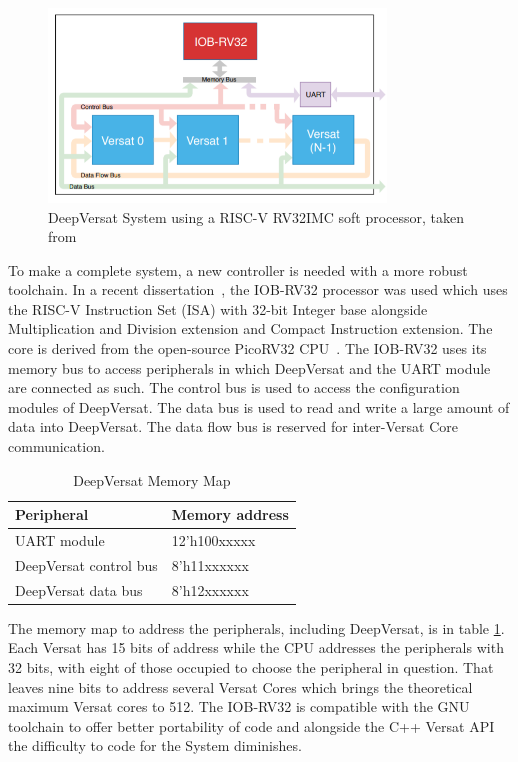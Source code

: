 \begin{figure}[!htbp]
    \centering
    \includegraphics[width=0.8\textwidth]{Figures/deep-Versat-top.png}
    \caption{DeepVersat System using a RISC-V RV32IMC soft processor, taken from~\cite{valter:deepversat}}
    \label{figure:deepversattop}
\end{figure} 

\quad To make a complete system, a new controller is needed with a more robust toolchain.
In a recent dissertation~\cite{valter:deepversat}, the IOB-RV32 processor was used which uses the RISC-V Instruction Set (ISA) with 32-bit Integer base alongside Multiplication and Division extension and Compact Instruction extension.
 The core is derived from
the open-source PicoRV32 CPU~\cite{picorv}.
The IOB-RV32 uses its memory bus to access peripherals in which DeepVersat and the UART module are connected as such.
The control bus is used to access the configuration modules of DeepVersat. The data bus is used to read and write
a large amount of data into DeepVersat. The data flow bus is reserved for inter-Versat Core communication.

\begin{table}[!htbp]
    \centering
    \begin{tabular}{|ll|}
        \hline
        \textbf{Peripheral}     & \textbf{Memory address} \\ \hline
        UART module             & 12’h100xxxxx            \\ \hline
        DeepVersat control bus & 8’h11xxxxxx             \\ \hline
        DeepVersat data bus    & 8’h12xxxxxx             \\ \hline
        \end{tabular}
    \caption{DeepVersat Memory Map}
    \label{table:deepversat}
    \end{table}


The memory map to address the peripherals,
 including DeepVersat, is in table \ref{table:deepversat}.
 Each Versat has 15 bits of address while the CPU addresses
 the peripherals with 32 bits, with eight of those occupied to choose
 the peripheral in question. That leaves nine bits to address several Versat Cores
 which brings the theoretical maximum Versat cores to 512. The IOB-RV32 is compatible with the
 GNU toolchain to offer better portability of code and alongside the C++ Versat API the difficulty
 to code for the System diminishes.
